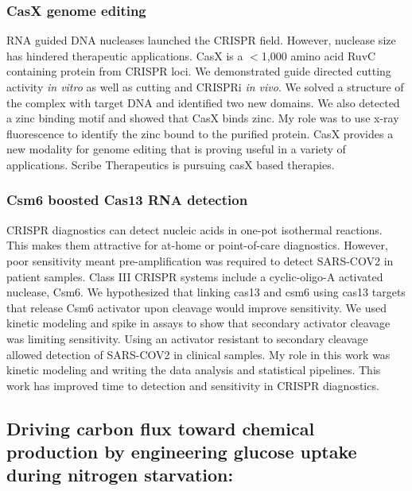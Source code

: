 \documentclass{article}
\begin{document}
\subsubsection{CasX genome editing}
RNA guided DNA nucleases launched the CRISPR field.
However, nuclease size has hindered therapeutic applications.
CasX is a $<$1,000 amino acid RuvC containing protein from CRISPR loci.
We demonstrated guide directed cutting activity \textit{in vitro} as well as cutting and CRISPRi \textit{in vivo}.
We solved a structure of the complex with target DNA and identified two new domains.
We also detected a zinc binding motif and showed that CasX binds zinc.
My role was to use x-ray fluorescence to identify the zinc bound to the purified protein.
CasX provides a new modality for genome editing that is proving useful in a variety of applications.
Scribe Therapeutics is pursuing casX based therapies.
%
\subsubsection{Csm6 boosted Cas13 RNA detection}
CRISPR diagnostics can detect nucleic acids in one-pot isothermal reactions.
This makes them attractive for at-home or point-of-care diagnostics.
However, poor sensitivity meant pre-amplification was required to detect SARS-COV2 in patient samples.
Class III CRISPR systems include a cyclic-oligo-A activated nuclease, Csm6.
We hypothesized that linking cas13 and csm6 using cas13 targets that release Csm6 activator upon cleavage would improve sensitivity.
We used kinetic modeling and spike in assays to show that secondary activator cleavage was limiting sensitivity.
Using an activator resistant to secondary cleavage allowed detection of SARS-COV2 in clinical samples.
My role in this work was kinetic modeling and writing the data analysis and statistical pipelines.
This work has improved time to detection and sensitivity in CRISPR diagnostics.
%

\nocite{Liu2021-pu,Liu2019-nk}
\printbibliography[heading=none]



\newrefsection
\subsection{Driving carbon flux toward chemical production by engineering glucose uptake during nitrogen starvation:}
\end{document}
